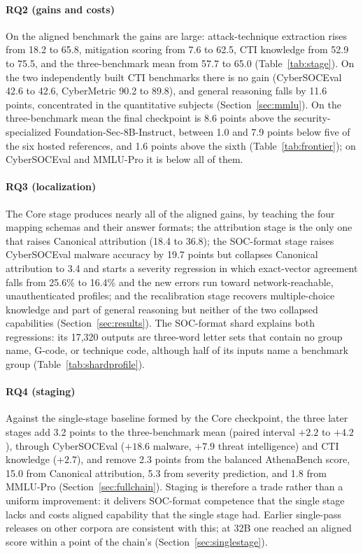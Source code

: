 \documentclass[a4paper,fleqn]{cas-dc}
\begin{document}
\paragraph{RQ2 (gains and costs)}
On the aligned benchmark the gains are large: attack-technique extraction rises from 18.2 to 65.8, mitigation scoring from 7.6 to 62.5, CTI knowledge from 52.9 to 75.5, and the three-benchmark mean from 57.7 to 65.0 (Table~\ref{tab:stage}). On the two independently built CTI benchmarks there is no gain (CyberSOCEval 42.6 to 42.6, CyberMetric 90.2 to 89.8), and general reasoning falls by 11.6 points, concentrated in the quantitative subjects (Section~\ref{sec:mmlu}). On the three-benchmark mean the final checkpoint is 8.6 points above the security-specialized Foundation-Sec-8B-Instruct, between 1.0 and 7.9 points below five of the six hosted references, and 1.6 points above the sixth (Table~\ref{tab:frontier}); on CyberSOCEval and MMLU-Pro it is below all of them.

\paragraph{RQ3 (localization)}
The Core stage produces nearly all of the aligned gains, by teaching the four mapping schemas and their answer formats; the attribution stage is the only one that raises Canonical attribution (18.4 to 36.8); the SOC-format stage raises CyberSOCEval malware accuracy by 19.7 points but collapses Canonical attribution to 3.4 and starts a severity regression in which exact-vector agreement falls from 25.6\% to 16.4\% and the new errors run toward network-reachable, unauthenticated profiles; and the recalibration stage recovers multiple-choice knowledge and part of general reasoning but neither of the two collapsed capabilities (Section~\ref{sec:results}). The SOC-format shard explains both regressions: its 17,320 outputs are three-word letter sets that contain no group name, G-code, or technique code, although half of its inputs name a benchmark group (Table~\ref{tab:shardprofile}).

\paragraph{RQ4 (staging)}
Against the single-stage baseline formed by the Core checkpoint, the three later stages add 3.2 points to the three-benchmark mean (paired interval $+2.2$ to $+4.2$), through CyberSOCEval ($+18.6$ malware, $+7.9$ threat intelligence) and CTI knowledge ($+2.7$), and remove 2.3 points from the balanced AthenaBench score, 15.0 from Canonical attribution, 5.3 from severity prediction, and 1.8 from MMLU-Pro (Section~\ref{sec:fullchain}). Staging is therefore a trade rather than a uniform improvement: it delivers SOC-format competence that the single stage lacks and costs aligned capability that the single stage had. Earlier single-pass releases on other corpora are consistent with this; at 32B one reached an aligned score within a point of the chain's (Section~\ref{sec:singlestage}).
\end{document}
